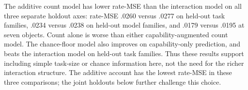The additive count model has lower rate-MSE than the interaction model on all three separate holdout axes: rate-MSE .0260 versus .0277 on held-out task families, .0234 versus .0238 on held-out model families, and .0179 versus .0195 at seven objects. Count alone is worse than either capability-augmented count model. The chance-floor model also improves on capability-only prediction, and beats the interaction model on held-out task families. Thus these results support including simple task-size or chance information here, not the need for the richer interaction structure. The additive account has the lowest rate-MSE in these three comparisons; the joint holdouts below further challenge this choice.
